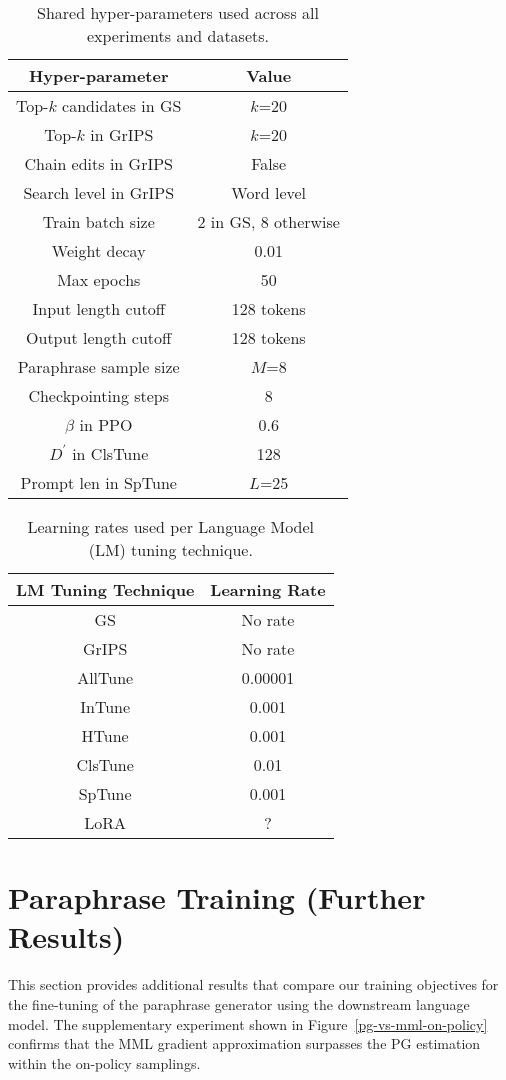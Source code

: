 \documentclass[11pt]{article}
\begin{document}
\begin{table}[t]
\centering
\caption{Shared hyper-parameters used across all experiments and datasets.}
\begin{tabular}{ c | c }
\hline
Hyper-parameter & Value\\
\hline
Top-$k$ candidates in GS & $k$=20 \\
Top-$k$ in GrIPS & $k$=20 \\
Chain edits in GrIPS & False \\
Search level in GrIPS & Word level \\
Train batch size & 2 in GS, 8 otherwise \\
Weight decay & 0.01 \\
Max epochs & 50 \\
Input length cutoff & 128 tokens \\
Output length cutoff & 128 tokens \\
Paraphrase sample size & $M$=8 \\
Checkpointing steps & 8 \\
$\beta$ in PPO & 0.6 \\
$D^{'}$ in ClsTune & 128 \\
Prompt len in SpTune & $L$=25
\end{tabular}
\label{hyper-parameters}
\end{table}

\begin{table}[t]
\centering
\caption{Learning rates used per Language Model (LM) tuning technique.}
\begin{tabular}{ c | c }
\hline
LM Tuning Technique & Learning Rate\\
\hline
GS & No rate \\
GrIPS & No rate \\
AllTune & 0.00001 \\
InTune &  0.001 \\
HTune & 0.001 \\
ClsTune & 0.01 \\
SpTune & 0.001 \\
LoRA & ?
\end{tabular}
\label{learning-rates}
\end{table}

\section{Paraphrase Training (Further Results)}
\label{training-paraphrase-extra:appendix}

This section provides additional results that compare our training objectives for the fine-tuning of the paraphrase generator using the downstream language model. The supplementary experiment shown in Figure~\ref{pg-vs-mml-on-policy} confirms that the MML gradient approximation surpasses the PG estimation within the on-policy samplings.
\end{document}

